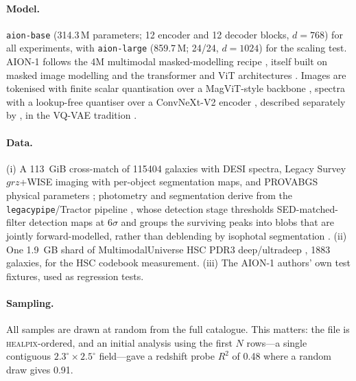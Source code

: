 \documentclass[11pt]{article}
\newcommand{\aion}{AION-1}
\begin{document}
\paragraph{Model.} \texttt{aion-base} (\num{314.3}\,M parameters; 12 encoder and 12 decoder
blocks, $d=768$) for all experiments, with \texttt{aion-large} (\num{859.7}\,M; 24/24,
$d=1024$) for the scaling test. \aion{} follows the 4M multimodal masked-modelling recipe
\citep{mizrahi20234m,bachmann20244m21}, itself built on masked image modelling
\citep{he2021masked,chang2022maskgit} and the transformer and ViT architectures
\citep{vaswani2017attention,dosovitskiy2020image}. Images are tokenised with finite scalar
quantisation \citep{mentzer2023finite} over a MagViT-style backbone
\citep{yu2024language,esser2020taming}, spectra with a lookup-free quantiser over a ConvNeXt-V2
encoder \citep{liu2022convnet,woo2023convnextv2}, described separately by
\citet{shen2025spectral}, in the VQ-VAE tradition
\citep{vandenoord2017neural,yu2022vector,huh2023straightening}.

\paragraph{Data.} (i) A \SI{113}{GiB} cross-match of \num{115404} galaxies with DESI spectra,
Legacy Survey $grz$+WISE imaging with per-object segmentation maps, and PROVABGS physical
parameters \citep{hahn2023provabgs,hahn2023bgs}; photometry and segmentation derive from the
\texttt{legacypipe}/Tractor pipeline \citep{lang2016tractor,lang2025legacypipe}, whose detection stage
thresholds SED-matched-filter detection maps at $6\sigma$ and groups the surviving peaks into
blobs that are jointly forward-modelled, rather than deblending by isophotal segmentation
\citep{bertin1996sextractor}. (ii) One
\SI{1.9}{GB} shard of MultimodalUniverse HSC PDR3 deep/ultradeep \citep{mmu2024multimodal,
aihara2022hscpdr3}, 1883 galaxies, for the HSC codebook measurement. (iii) The \aion{} authors'
own test fixtures, used as regression tests.

\paragraph{Sampling.} All samples are drawn at random from the full catalogue. This matters: the
file is \textsc{healpix}-ordered, and an initial analysis using the first $N$ rows---a single
contiguous $2.3^\circ\times2.5^\circ$ field---gave a redshift probe $R^2$ of 0.48 where a
random draw gives 0.91.
\end{document}
